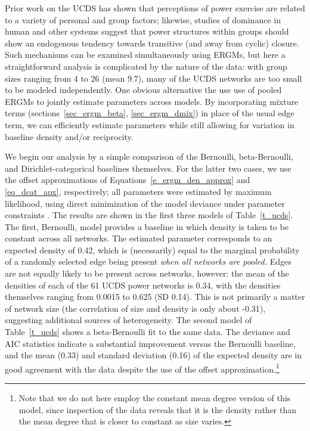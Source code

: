 \documentclass[11pt]{article}
\begin{document}
Prior work on the UCDS \citep[e.g.,][]{martin:ajs:2002,martin.fuller:spq:2004,martin:ajs:2005} has shown that perceptions of power exercise are related to a variety of personal and group factors; likewise, studies of dominance in human and other systems \citep[e.g.,][]{chase:asr:1980,chase.et.al:pnas:2002} suggest that power structures within groups should show an endogenous tendency towards transitive (and away from cyclic) closure.  Such mechanisms can be examined simultaneously using ERGMs, but here a straightforward analysis is complicated by the nature of the data: with group sizes ranging from 4 to 26 (mean 9.7), many of the UCDS networks are too small to be modeled independently.  One obvious alternative the use use of pooled ERGMs to jointly estimate parameters across models.  By incorporating mixture terms (sections~\ref{sec_ergm_beta}, \ref{sec_ergm_dmix}) in place of the usual edge term, we can efficiently estimate parameters while still allowing for variation in baseline density and/or reciprocity.

We begin our analysis by a simple comparison of the Bernoulli, beta-Bernoulli, and Dirichlet-categorical baselines themselves.  For the latter two cases, we use the offset approximations of Equations~\ref{e_ergm_den_approx} and \ref{eq_dcat_apx}, respectively; all parameters were estimated by maximum likelihood, using direct minimization of the model deviance under parameter constraints \citep{byrd.et.al:siamjsc:1995}.  The results are shown in the first three models of Table~\ref{t_ucds}.  The first, Bernoulli, model provides a baseline in which density is taken to be constant across all networks.  The estimated parameter corresponds to an expected density of 0.42, which is (necessarily) equal to the marginal probability of a randomly selected edge being present \emph{when all networks are pooled.}  Edges are not equally likely to be present across networks, however: the mean of the densities of each of the 61 UCDS power networks is 0.34, with the densities themselves ranging from 0.0015 to 0.625 (SD 0.14).  This is not primarily a matter of network size (the correlation of size and density is only about -0.31), suggesting additional sources of heterogeneity.  The second model of Table~\ref{t_ucds} shows a beta-Bernoulli fit to the same data.  The deviance and AIC statistics indicate a substantial improvement versus the Bernoulli baseline, and the  mean (0.33) and standard deviation (0.16) of the expected density are in good agreement with the data despite the use of the offset approximation.\footnote{Note that we do not here employ the constant mean degree version of this model, since inspection of the data reveals that it is the density rather than the mean degree that is closer to constant as size varies.}  
\end{document}
